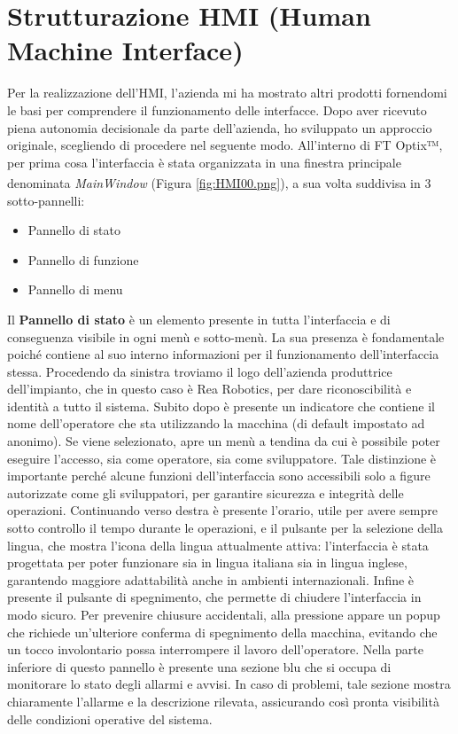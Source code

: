 \section{Strutturazione HMI (Human Machine Interface)}
Per la realizzazione dell'HMI, l'azienda mi ha mostrato altri prodotti fornendomi le basi per comprendere il funzionamento delle interfacce. Dopo aver ricevuto piena autonomia decisionale da parte dell'azienda, ho sviluppato un approccio originale, scegliendo di procedere nel seguente modo. All'interno di FT Optix™, per prima cosa l'interfaccia è stata organizzata in una finestra principale denominata \textit{MainWindow}\textsuperscript{\cite{rockwelloptixmainwindow}} (Figura \ref{fig:HMI00.png}), a sua volta suddivisa in 3 sotto-pannelli:
\begin{itemize}
    \item Pannello di stato
    \item Pannello di funzione
    \item Pannello di menu
\end{itemize}
Il \textbf{Pannello di stato} è un elemento presente in tutta l'interfaccia e di conseguenza visibile in ogni menù e sotto-menù. La sua presenza è fondamentale poiché contiene al suo interno informazioni per il funzionamento dell'interfaccia stessa. Procedendo da sinistra troviamo il logo dell'azienda produttrice dell'impianto, che in questo caso è Rea Robotics, per dare riconoscibilità e identità a tutto il sistema. Subito dopo è presente un indicatore che contiene il nome dell'operatore che sta utilizzando la macchina (di default impostato ad anonimo). Se viene selezionato, apre un menù a tendina da cui è possibile poter eseguire l'accesso, sia come operatore, sia come sviluppatore. Tale distinzione è importante perché alcune funzioni dell'interfaccia sono accessibili solo a figure autorizzate come gli sviluppatori, per garantire sicurezza e integrità delle operazioni. 
Continuando verso destra è presente l'orario, utile per avere sempre sotto controllo il tempo durante le operazioni, e il pulsante per la selezione della lingua, che mostra l'icona della lingua attualmente attiva: l'interfaccia è stata progettata per poter funzionare sia in lingua italiana sia in lingua inglese, garantendo maggiore adattabilità anche in ambienti internazionali. Infine è presente il pulsante di spegnimento, che permette di chiudere l'interfaccia in modo sicuro. Per prevenire chiusure accidentali, alla pressione appare un popup che richiede un'ulteriore conferma di spegnimento della macchina, evitando che un tocco involontario possa interrompere il lavoro dell'operatore.
Nella parte inferiore di questo pannello è presente una sezione blu che si occupa di monitorare lo stato degli allarmi e avvisi. In caso di problemi, tale sezione mostra chiaramente l'allarme e la descrizione rilevata, assicurando così pronta visibilità delle condizioni operative del sistema.

